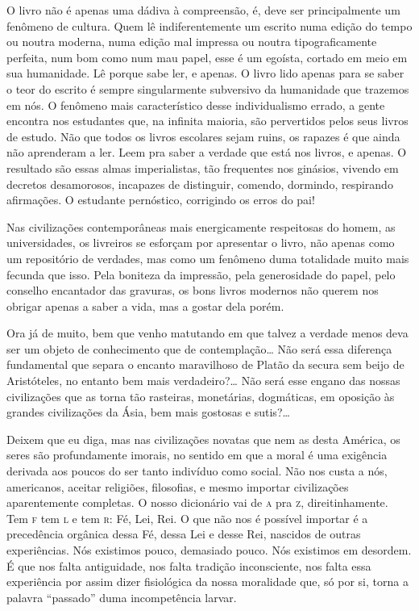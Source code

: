 O livro não é apenas uma dádiva à compreensão, é, deve ser
principalmente um fenômeno de cultura. Quem lê indiferentemente um
escrito numa edição do tempo ou noutra moderna, numa edição mal impressa
ou noutra tipograficamente perfeita, num bom como num mau papel, esse é
um egoísta, cortado em meio em sua humanidade. Lê porque sabe ler, e
apenas. O livro lido apenas para se saber o teor do escrito é sempre
singularmente subversivo da humanidade que trazemos em nós. O fenômeno
mais característico desse individualismo errado, a gente encontra nos
estudantes que, na infinita maioria, são pervertidos pelos seus livros
de estudo. Não que todos os livros escolares sejam ruins, os rapazes é
que ainda não aprenderam a ler. Leem pra saber a verdade que está nos
livros, e apenas. O resultado são essas almas imperialistas, tão
frequentes nos ginásios, vivendo em decretos desamorosos, incapazes de
distinguir, comendo, dormindo, respirando afirmações. O estudante
pernóstico, corrigindo os erros do pai!

Nas civilizações contemporâneas mais energicamente respeitosas do homem,
as universidades, os livreiros se esforçam por apresentar o livro, não
apenas como um repositório de verdades, mas como um fenômeno duma
totalidade muito mais fecunda que isso. Pela boniteza da impressão, pela
generosidade do papel, pelo conselho encantador das gravuras, os bons
livros modernos não querem nos obrigar apenas a saber a vida, mas a
gostar dela porém.

Ora já de muito, bem que venho matutando em que talvez a verdade menos
deva ser um objeto de conhecimento que de contemplação\ldots{} Não será essa
diferença fundamental que separa o encanto maravilhoso de Platão da
secura sem beijo de Aristóteles, no entanto bem mais verdadeiro?\ldots{} Não
será esse engano das nossas civilizações que as torna tão rasteiras,
monetárias, dogmáticas, em oposição às grandes civilizações da Ásia, bem
mais gostosas e sutis?\ldots{}


Deixem que eu diga, mas nas civilizações novatas que nem as desta
América, os seres são profundamente imorais, no sentido em que a moral é
uma exigência derivada aos poucos do ser tanto indivíduo como social.
Não nos custa a nós, americanos, aceitar religiões, filosofias, e mesmo
importar civilizações aparentemente completas. O nosso dicionário vai de
\textsc{a} pra \textsc{z}, direitinhamente. Tem \textsc{f} tem \textsc{l} e tem \textsc{r}: Fé, Lei, Rei. O que não
nos é possível importar é a precedência orgânica dessa Fé, dessa Lei e
desse Rei, nascidos de outras experiências. Nós existimos pouco,
demasiado pouco. Nós existimos em desordem. É que nos falta antiguidade,
nos falta tradição inconsciente, nos falta essa experiência por assim
dizer fisiológica da nossa moralidade que, só por si, torna a palavra
``passado'' duma incompetência larvar.

